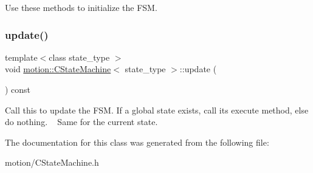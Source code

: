 Use these methods to initialize the F\+SM. \mbox{\label{classmotion_1_1CStateMachine_a8a944b6b5dcff9b614b434fabcd8955c}} 
\subsubsection{\texorpdfstring{update()}{update()}}
{\footnotesize\ttfamily template$<$class state\+\_\+type $>$ \\
void \mbox{\hyperlink{classmotion_1_1CStateMachine}{motion\+::\+C\+State\+Machine}}$<$ state\+\_\+type $>$\+::update (\begin{DoxyParamCaption}{ }\end{DoxyParamCaption}) const\hspace{0.3cm}{\ttfamily [inline]}}

Call this to update the F\+SM. If a global state exists, call its execute method, else do nothing. ~\newline
 Same for the current state. 

The documentation for this class was generated from the following file\+:\begin{DoxyCompactItemize}
\item 
motion/C\+State\+Machine.\+h\end{DoxyCompactItemize}
